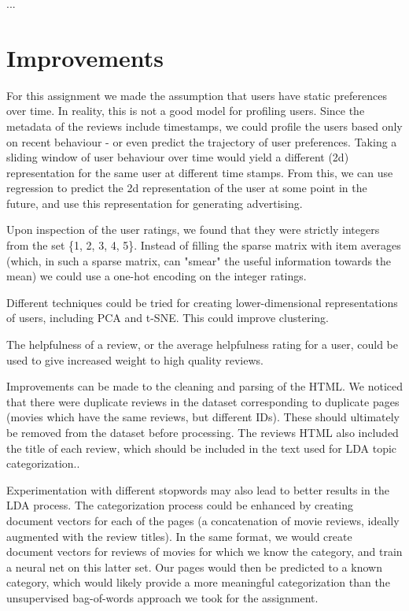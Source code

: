 \documentclass[11pt]{article}
\begin{document}
...


\section{Improvements}

For this assignment we made the assumption that users have static preferences over time. In reality, this is not a good model for profiling users. Since the metadata of the reviews include timestamps, we could profile the users based only on recent behaviour - or even predict the trajectory of user preferences. Taking a sliding window of user behaviour over time would yield a different (2d) representation for the same user at different time stamps. From this, we can use regression to predict the 2d representation of the user at some point in the future, and use this representation for generating advertising.\newline

Upon inspection of the user ratings, we found that they were strictly integers from the set \{1, 2, 3, 4, 5\}. Instead of filling the sparse matrix with item averages (which, in such a sparse matrix, can "smear" the useful information towards the mean) we could use a one-hot encoding on the integer ratings.\newline

Different techniques could be tried for creating lower-dimensional representations of users, including PCA and t-SNE. This could improve clustering.\newline

The helpfulness of a review, or the average helpfulness rating for a user, could be used to give increased weight to high quality reviews.\newline

Improvements can be made to the cleaning and parsing of the HTML. We noticed that there were duplicate reviews in the dataset corresponding to duplicate pages (movies which have the same reviews, but different IDs). These should ultimately be removed from the dataset before processing. The reviews HTML also included the title of each review, which should be included in the text used for LDA topic categorization.\newline.

Experimentation with different stopwords may also lead to better results in the LDA process. The categorization process could be enhanced by creating document vectors for each of the pages (a concatenation of movie reviews, ideally augmented with the review titles). In the same format, we would create document vectors for reviews of movies for which we know the category, and train a neural net on this latter set. Our pages would then be predicted to a known category, which would likely provide a more meaningful categorization than the unsupervised bag-of-words approach we took for the assignment.
\end{document}
